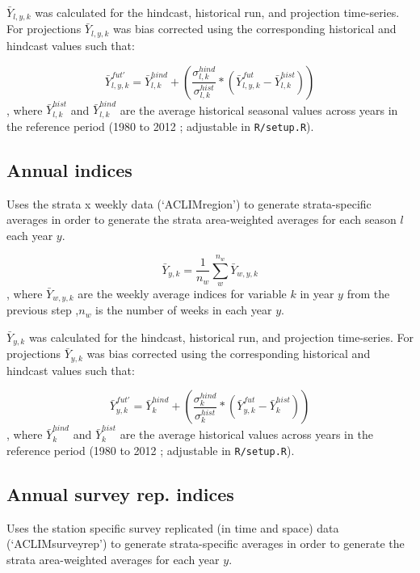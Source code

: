 \documentclass[
]{article}
\begin{document}
\(\bar{Y}_{l,y,k}\) was calculated for the hindcast, historical run, and
projection time-series. For projections \(\bar{Y}_{l,y,k}\) was bias
corrected using the corresponding historical and hindcast values such
that:

\[\bar{Y}^{fut'}_{l,y,k} =\bar{Y}^{hind}_{l,k} +\left( \frac{\sigma^{hind}_{l,k}}{\sigma^{hist}_{l,k}}*(\bar{Y}^{fut}_{l,y,k}-\bar{Y}^{hist}_{l,k})  \right )\],
where \(\bar{Y}^{hist}_{l,k}\) and \(\bar{Y}^{hind}_{l,k}\) are the
average historical seasonal values across years in the reference period
(1980 to 2012 ; adjustable in \texttt{R/setup.R}).

\hypertarget{annual-indices}{%
\subsection{Annual indices}\label{annual-indices}}

Uses the strata x weekly data (`ACLIMregion') to generate
strata-specific averages in order to generate the strata area-weighted
averages for each season \(l\) each year \(y\).

\[\bar{Y}_{y,k}= \frac{1}{n_w}\sum^{n_w}_{w}\bar{Y}_{w,y,k}\], where
\(\bar{Y}_{w,y,k}\) are the weekly average indices for variable \(k\) in
year \(y\) from the previous step ,\(n_w\) is the number of weeks in
each year \(y\).

\(\bar{Y}_{y,k}\) was calculated for the hindcast, historical run, and
projection time-series. For projections \(\bar{Y}_{y,k}\) was bias
corrected using the corresponding historical and hindcast values such
that:

\[\bar{Y}^{fut'}_{y,k} =\bar{Y}^{hind}_{k} +\left( \frac{\sigma^{hind}_{k}}{\sigma^{hist}_{k}}*(\bar{Y}^{fut}_{y,k}-\bar{Y}^{hist}_{k})  \right )\],
where \(\bar{Y}^{hind}_{k}\) and \(\bar{Y}^{hist}_{k}\) are the average
historical values across years in the reference period (1980 to 2012 ;
adjustable in \texttt{R/setup.R}).

\hypertarget{annual-survey-rep.-indices}{%
\subsection{Annual survey rep.
indices}\label{annual-survey-rep.-indices}}

Uses the station specific survey replicated (in time and space) data
(`ACLIMsurveyrep') to generate strata-specific averages in order to
generate the strata area-weighted averages for each year \(y\).
\end{document}
